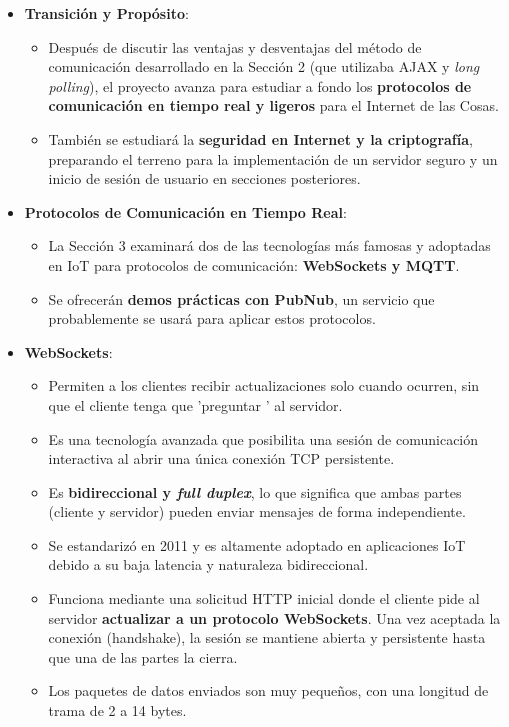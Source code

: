 \documentclass{report}
\begin{document}
\begin{itemize}
    \item \textbf{Transición y Propósito}:
    \begin{itemize}
        \item Después de discutir las ventajas y desventajas del método de comunicación desarrollado en la Sección 2 (que utilizaba AJAX y 
        \textit{long polling}), el proyecto avanza para estudiar a fondo los \textbf{protocolos de comunicación en tiempo real y ligeros} para el 
        Internet de las Cosas.
        \item También se estudiará la \textbf{seguridad en Internet y la criptografía}, preparando el terreno para la implementación de un servidor 
        seguro y un inicio de sesión de usuario en secciones posteriores.
    \end{itemize}

    \item \textbf{Protocolos de Comunicación en Tiempo Real}:
    \begin{itemize}
        \item La Sección 3 examinará dos de las tecnologías más famosas y adoptadas en IoT para protocolos de comunicación: \textbf{WebSockets y MQTT}.
        \item Se ofrecerán \textbf{demos prácticas con PubNub}, un servicio que probablemente se usará para aplicar estos protocolos.
    \end{itemize}

    \item \textbf{WebSockets}:
    \begin{itemize}
        \item Permiten a los clientes recibir actualizaciones solo cuando ocurren, sin que el cliente tenga que  'preguntar ' al servidor.
        \item Es una tecnología avanzada que posibilita una sesión de comunicación interactiva al abrir una única conexión TCP persistente.
        \item Es \textbf{bidireccional y \textit{full duplex}}, lo que significa que ambas partes (cliente y servidor) pueden enviar mensajes de forma 
        independiente.
        \item Se estandarizó en 2011 y es altamente adoptado en aplicaciones IoT debido a su baja latencia y naturaleza bidireccional.
        \item Funciona mediante una solicitud HTTP inicial donde el cliente pide al servidor \textbf{actualizar a un protocolo WebSockets}. Una vez 
        aceptada la conexión (handshake), la sesión se mantiene abierta y persistente hasta que una de las partes la cierra.
        \item Los paquetes de datos enviados son muy pequeños, con una longitud de trama de 2 a 14 bytes.
    \end{itemize}


\end{itemize}
\end{document}
